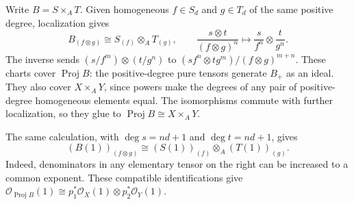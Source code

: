 Write $B=S\times_AT$. Given homogeneous $f\in S_d$ and $g\in T_d$ of the same positive degree, localization gives
\[B_{(f\otimes g)}\cong S_{(f)}\otimes_AT_{(g)},\qquad \frac{s\otimes t}{(f\otimes g)^n}\mapsto\frac{s}{f^n}\otimes\frac{t}{g^n}.\]
The inverse sends $(s/f^m)\otimes(t/g^n)$ to $(sf^n\otimes tg^m)/(f\otimes g)^{m+n}$. These charts cover $\operatorname{Proj}B$: the positive-degree pure tensors generate $B_+$ as an ideal. They also cover $X\times_AY$, since powers make the degrees of any pair of positive-degree homogeneous elements equal. The isomorphisms commute with further localization, so they glue to $\operatorname{Proj}B\cong X\times_AY$.

The same calculation, with $\deg s=nd+1$ and $\deg t=nd+1$, gives
\[(B(1))_{(f\otimes g)}\cong(S(1))_{(f)}\otimes_A(T(1))_{(g)}.\]
Indeed, denominators in any elementary tensor on the right can be increased to a common exponent. These compatible identifications give $\mathcal O_{\operatorname{Proj}B}(1)\cong p_1^*\mathcal O_X(1)\otimes p_2^*\mathcal O_Y(1)$.
